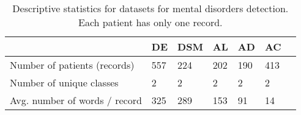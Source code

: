 \begin{table}[]
\centering
\begin{tabular}{@{}lllllll@{}}
\toprule
                                  & \textbf{DE} & \textbf{DSM} & \textbf{AL} & \textbf{AD} & \textbf{AC} & \\ \midrule
Number of patients (records)               & 557           & 224     & 202 & 190 & 413            &  \\
Number of unique classes          & 2              & 2         & 2 & 2 & 2             &  \\
Avg. number of words / record & 325            & 289       & 153 & 91 & 14            &  \\
 \bottomrule
\end{tabular}
\caption{Descriptive statistics for datasets for mental disorders detection. Each patient has only one record.}
\label{tab:psy_datastats}
\end{table}